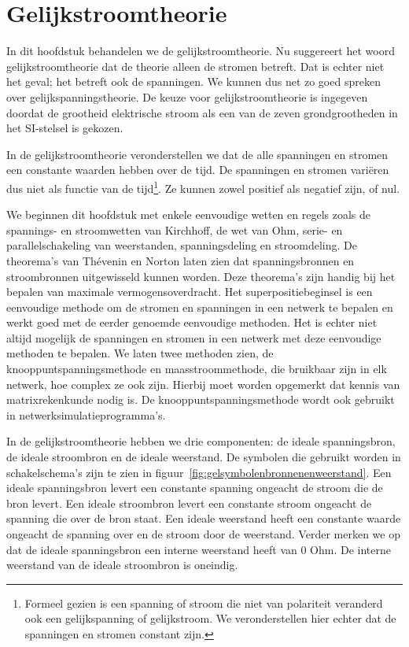 \chapter{Gelijkstroomtheorie}
\label{cha:gelijkstroomtheorie}

\newif\ifeen
\newif\ifgestuurdebronnen
\newif\ifknooppunt
\newif\ifmaasstroom
\newif\ifopgaven

\eentrue
\gestuurdebronnentrue
\knooppunttrue
\maasstroomtrue
\opgaventrue


\ifeen

In dit hoofdstuk behandelen we de gelijkstroomtheorie. Nu suggereert het woord
gelijkstroomtheorie dat de theorie alleen de stromen betreft. Dat is echter niet
het geval; het betreft ook de spanningen. We kunnen dus net zo goed spreken over
gelijkspanningstheorie. De keuze voor gelijkstroomtheorie is ingegeven doordat de
grootheid elektrische stroom als een van de zeven grondgrootheden in
het SI-stelsel is gekozen.

In de gelijkstroomtheorie veronderstellen we dat de alle spanningen en stromen
een constante waarden hebben over de tijd. De spanningen en stromen variëren
dus niet als functie van de tijd\footnote{Formeel gezien is een spanning of stroom
die niet van polariteit veranderd ook een gelijkspanning of gelijkstroom. We
veronderstellen hier echter dat de spanningen en stromen constant zijn.}.
Ze kunnen zowel positief als negatief zijn, of nul.

We beginnen dit hoofdstuk met enkele eenvoudige wetten en regels zoals de spannings-
en stroomwetten van Kirchhoff, de wet van Ohm, serie- en parallelschakeling van
weerstanden, spanningsdeling en stroomdeling.
De theorema's van Thévenin en Norton laten zien dat spanningsbronnen en stroombronnen
uitgewisseld kunnen worden. Deze theorema's zijn handig bij het bepalen van
maximale vermogensoverdracht. Het superpositiebeginsel is een eenvoudige methode
om de stromen en spanningen in een netwerk te bepalen en werkt goed met de
eerder genoemde eenvoudige methoden.
Het is echter niet altijd mogelijk de spanningen en stromen in een netwerk met
deze eenvoudige methoden te bepalen. We laten twee methoden zien, de
knooppuntspanningsmethode en maasstroommethode, die bruikbaar zijn in elk netwerk,
hoe complex ze ook zijn. Hierbij moet worden opgemerkt dat kennis van matrixrekenkunde
nodig is. De knooppuntspanningsmethode wordt ook gebruikt in netwerksimulatieprogramma's.

In de gelijkstroomtheorie hebben we drie componenten: de ideale spanningsbron,
de ideale stroombron en de ideale weerstand. De symbolen die gebruikt worden in
schakelschema's zijn te zien in figuur~\ref{fig:gelsymbolenbronnenenweerstand}. Een
ideale spanningsbron levert een constante spanning ongeacht de stroom die de bron
levert. Een ideale stroombron levert een constante stroom ongeacht de spanning die
over de bron staat. Een ideale weerstand heeft een constante waarde ongeacht de
spanning over en de stroom door de weerstand. Verder merken we op dat de ideale
spanningsbron een interne weerstand heeft van 0 Ohm. De interne weerstand van de
ideale stroombron is oneindig.


